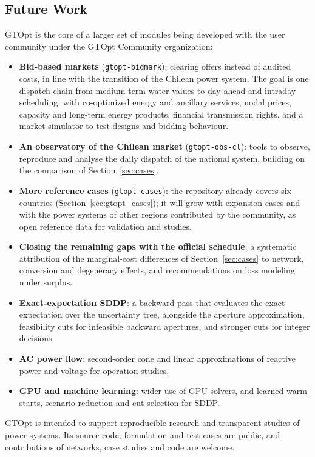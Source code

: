 \subsection{Future Work}

GTOpt is the core of a larger set of modules being developed with the
user community under the GTOpt Community organization:

\begin{itemize}
  \item \textbf{Bid-based markets} (\texttt{gtopt-bidmark}): clearing
    offers instead of audited costs, in line with the transition of the
    Chilean power system.  The goal is one dispatch chain from
    medium-term water values to day-ahead and intraday scheduling, with
    co-optimized energy and ancillary services, nodal prices, capacity
    and long-term energy products, financial transmission rights, and a
    market simulator to test designs and bidding behaviour.
  \item \textbf{An observatory of the Chilean market}
    (\texttt{gtopt-obs-cl}): tools to observe, reproduce and analyse
    the daily dispatch of the national system, building on the
    comparison of Section~\ref{sec:cases}.
  \item \textbf{More reference cases} (\texttt{gtopt-cases}): the
    repository already covers six countries
    (Section~\ref{sec:gtopt_cases}); it will grow with expansion cases
    and with the power systems of other regions contributed by the
    community, as open reference data for validation and studies.
  \item \textbf{Closing the remaining gaps with the official schedule}:
    a systematic attribution of the marginal-cost differences of
    Section~\ref{sec:cases} to network, conversion and degeneracy
    effects, and recommendations on loss modeling under surplus.
  \item \textbf{Exact-expectation SDDP}: a backward pass that evaluates
    the exact expectation over the uncertainty tree, alongside the
    aperture approximation, feasibility cuts for infeasible backward
    apertures, and stronger cuts for integer decisions.
  \item \textbf{AC power flow}: second-order cone and linear
    approximations of reactive power and voltage for operation studies.
  \item \textbf{GPU and machine learning}: wider use of GPU solvers,
    and learned warm starts, scenario reduction and cut selection for
    SDDP.
\end{itemize}

GTOpt is intended to support reproducible research and transparent
studies of power systems.  Its source code, formulation and test cases
are public, and contributions of networks, case studies and code are
welcome.
